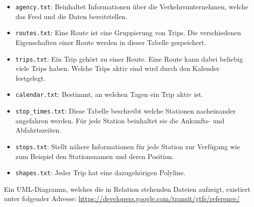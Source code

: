 \begin{newpage}
  		\begin{itemize}
  			\item \texttt{agency.txt}: Beinhaltet Informationen über die Verkehrsunternehmen, welche das Feed und die Daten bereitstellen.

  			\item \texttt{routes.txt}: Eine Route ist eine Gruppierung von Trips. Die verschiedenen Eigenschaften einer Route werden in dieser Tabelle gespeichert.

  			\item \texttt{trips.txt}: Ein Trip gehört zu einer Route. Eine Route kann dabei beliebig viele Trips haben. Welche Trips aktiv sind wird durch den Kalender festgelegt.

  			\item \texttt{calendar.txt}: Bestimmt, an welchen Tagen ein Trip aktiv ist.

  			\item \texttt{stop\_times.txt}: Diese Tabelle beschreibt welche Stationen nacheinander angefahren werden. Für jede Station beinhaltet sie die Ankunfts- und Abfahrtszeiten.

  			\item \texttt{stops.txt}: Stellt nähere Informationen für jede Station zur Verfügung wie zum Beispiel den Stationsnamen und deren Position.

  			\item \texttt{shapes.txt}: Jeder Trip hat eine dazugehörigen Polyline.

  		\end{itemize}

      Ein UML-Diagramm, welches die in Relation stehenden Dateien aufzeigt, existiert unter folgender Adresse: \url{https://developers.google.com/transit/gtfs/reference/} 



\end{newpage}


